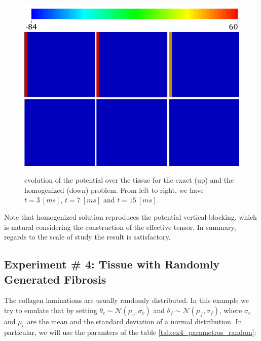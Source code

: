 \begin{figure}[!htbp]
\centering
\includegraphics[height = 0.8 cm]{fig/Numerical_Experiments/ex3/ex3_colourbar}\\[0.1 cm]
\includegraphics[height = 6 cm]{fig/Numerical_Experiments/ex3/results}
\caption{evolution of the potential over the tissue for the exact (up) and the homogenized (down) problem. From left to right, we have $t = 3~[ms]$, $t = 7~[ms]$ and $t = 15~[ms]$.} \label{fig:results_exp3}
\end{figure}

Note that homogenized solution reproduces the potential vertical blocking, which is natural considering the construction of the effective tensor. In summary, regards to the scale of study the result is satisfactory.

\subsection{Experiment \# 4: Tissue with Randomly Generated Fibrosis}

The collagen laminations are usually randomly distributed. In this example we try to emulate that by setting $\theta_c  \sim \mathcal{N}(\mu_c, \sigma_c)$ and $\theta_f \sim \mathcal{N}(\mu_f, \sigma_f)$, where $\sigma_c$ and $\mu_c$ are the mean and the standard deviation of a normal distribution. In particular, we will use the paramters of the table \ref{tab:ex4_parametros_random}:

